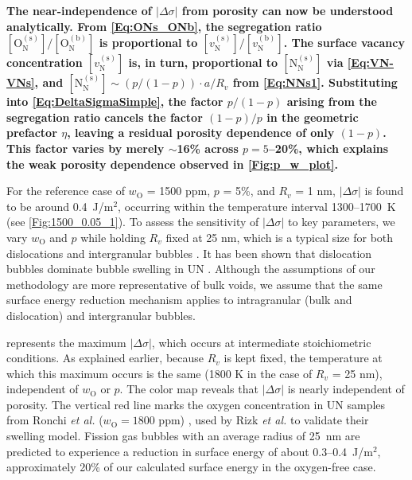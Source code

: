 \documentclass[preprint,12pt,sort&compress]{elsarticle}
\newcommand{\?}{\stackrel{?}{=}}
\providecommand{\DIFaddtex}[1]{{\bf #1}} %
\providecommand{\DIFaddbegin}{\protect\color{blue}} %
\providecommand{\DIFaddend}{\protect\color{black}} %
\providecommand{\DIFadd}[1]{\texorpdfstring{\DIFaddtex{#1}}{#1}} %
\newcommand{\DIFaddincludegraphics}[2][]{{\color{blue}\fbox{\DIFOincludegraphics[#1]{#2}}}} %
\DeclareRobustCommand{\DIFaddbegin}{\DIFOaddbegin \let\includegraphics\DIFaddincludegraphics} %
\DeclareRobustCommand{\DIFaddend}{\DIFOaddend \let\includegraphics\DIFOincludegraphics} %
\begin{document}
\DIFaddbegin \DIFadd{The near-independence of $|\Delta \sigma|$ from porosity can now be understood analytically. From \cref{Eq:ONs_ONb}, the segregation ratio $[\text{O}_\text{N}^{(\text{s})}] / [\text{O}_\text{N}^{(\text{b})}]$ is proportional to $[v_\text{N}^{(\text{s})}] / [v_\text{N}^{(\text{b})}]$. The surface vacancy concentration $[v_\text{N}^{(\text{s})}]$ is, in turn, proportional to $[\text{N}_\text{N}^{(\text{s})}]$ via \cref{Eq:VN-VNs}, and $[\text{N}_\text{N}^{(\text{s})}] \sim (p/(1-p)) \cdot a/R_v$ from \cref{Eq:NNs1}. Substituting into \cref{Eq:DeltaSigmaSimple}, the factor $p/(1-p)$ arising from the segregation ratio cancels the factor $(1-p)/p$ in the geometric prefactor $\eta$, leaving a residual porosity dependence of only $(1-p)$. This factor varies by merely $\sim$16\% across $p = 5$--20\%, which explains the weak porosity dependence observed in \cref{Fig:p_w_plot}.
}

\DIFaddend For the reference case of $w_\text{O}$ = 1500 ppm, $p$ = 5\%, and $R_v$ = 1 nm, $|\Delta \sigma|$ is found to be around 0.4~J/m$^2$, occurring within the temperature interval 1300--1700~K (see \cref{Fig:1500_0.05_1}). To assess the sensitivity of $|\Delta \sigma|$ to key parameters, we vary $w_\text{O}$ and $p$ while holding $R_v$ fixed at 25 nm, which is a typical size for both dislocations and intergranular bubbles \cite{Colin1983}. It has been shown that dislocation bubbles dominate bubble swelling in UN \cite{Ronchi1975,Ronchi1978,Rizk2025}. Although the assumptions of our methodology are more representative of bulk voids, we assume that the same surface energy reduction mechanism applies to intragranular (bulk and dislocation) and intergranular bubbles.

 represents the maximum $|\Delta \sigma|$, which occurs at intermediate stoichiometric conditions. As explained earlier, because $R_v$ is kept fixed, the temperature at which this maximum occurs is the same (1800 K in the case of $R_v$ = 25 nm), independent of $w_\text{O}$ or $p$. The color map reveals that $|\Delta \sigma|$ is nearly independent of porosity. The vertical red line marks the oxygen concentration in UN samples from Ronchi \textit{et al.} ($w_\text{O} = 1800$ ppm) \cite{Ronchi1975,Ronchi1978}, used by Rizk \textit{et al.} \cite{Rizk2025} to validate their swelling model. Fission gas bubbles with an average radius of 25~nm are predicted to experience a reduction in surface energy of about 0.3--0.4~J/m$^2$, approximately 20\% of our calculated surface energy in the oxygen-free case.
\end{document}
